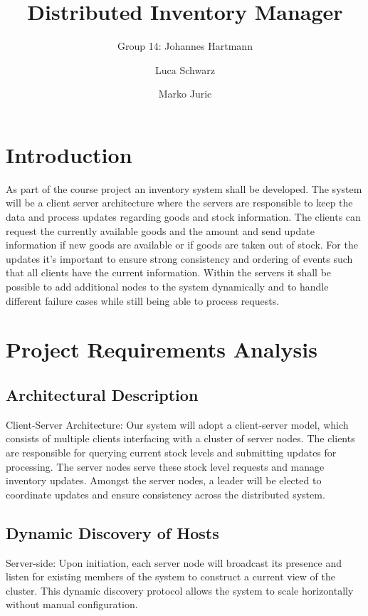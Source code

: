 \documentclass[runningheads]{llncs}
\begin{document}
%
\title{Distributed Inventory Manager}

\author{Group 14: Johannes Hartmann \and Luca Schwarz \and Marko Juric}

\institute{}
%
\maketitle              %

\section{Introduction}

As part of the course project an inventory system shall be developed. The system will be a client server architecture where the servers are responsible to keep the data and process updates regarding goods and stock information. The clients can request the currently available goods and the amount and send update information if new goods are available or if goods are taken out of stock. For the updates it’s important to ensure strong consistency and ordering of events such that all clients have the current information. Within the servers it shall be possible to add additional nodes to the system dynamically and to handle different failure cases while still being able to process requests.


\section{Project Requirements Analysis}

\subsection{Architectural Description}

Client-Server Architecture: Our system will adopt a client-server model, which consists of multiple clients interfacing with a cluster of server nodes. The clients are responsible for querying current stock levels and submitting updates for processing. The server nodes serve these stock level requests and manage inventory updates. Amongst the server nodes, a leader will be elected to coordinate updates and ensure consistency across the distributed system.

\subsection{Dynamic Discovery of Hosts}
Server-side: Upon initiation, each server node will broadcast its presence and listen for existing members of the system to construct a current view of the cluster. This dynamic discovery protocol allows the system to scale horizontally without manual configuration.
\end{document}
